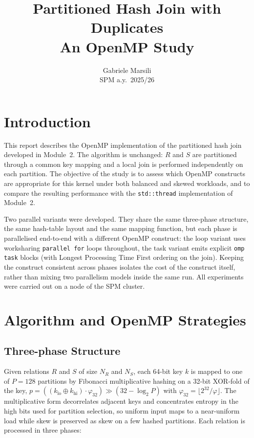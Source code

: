 \documentclass[10pt,twocolumn,a4paper]{article}
\title{\textbf{Partitioned Hash Join with Duplicates}\\\large An OpenMP Study}
\author{Gabriele Marsili \\ SPM a.y.\ 2025/26}
\date{}
\begin{document}
\maketitle
\thispagestyle{empty}

\section{Introduction}
This report describes the OpenMP implementation of the partitioned
hash join developed in Module~2. The algorithm is unchanged: $R$ and
$S$ are partitioned through a common key mapping and a local join is
performed independently on each partition. The objective of the study
is to assess which OpenMP constructs are appropriate for this kernel
under both balanced and skewed workloads, and to compare the resulting
performance with the \texttt{std::thread} implementation of Module~2.

Two parallel variants were developed. They share the same
three-phase structure, the same hash-table layout and the same
mapping function, but each phase is parallelised end-to-end with a
different OpenMP construct: the loop variant uses worksharing
\texttt{parallel for} loops throughout, the task variant emits
explicit \texttt{omp task} blocks (with Longest Processing Time
First ordering on the join). Keeping the construct consistent across
phases isolates the cost of the construct itself, rather than mixing
two parallelism models inside the same run. All experiments were
carried out on a node of the SPM cluster.

\section{Algorithm and OpenMP Strategies}

\subsection{Three-phase Structure}
Given relations $R$ and $S$ of size $N_R$ and $N_S$, each 64-bit
key $k$ is mapped to one of $P=128$ partitions by Fibonacci
multiplicative hashing on a 32-bit XOR-fold of the key,
$p = ((k_{\text{lo}} \oplus k_{\text{hi}})\cdot \varphi_{32}) \gg
(32-\log_2 P)$ with $\varphi_{32}=\lfloor 2^{32}/\varphi\rfloor$.
The multiplicative form decorrelates adjacent keys and concentrates
entropy in the high bits used for partition selection, so uniform
input maps to a near-uniform load while skew is preserved as skew on
a few hashed partitions. Each relation is processed in three phases:
\end{document}
